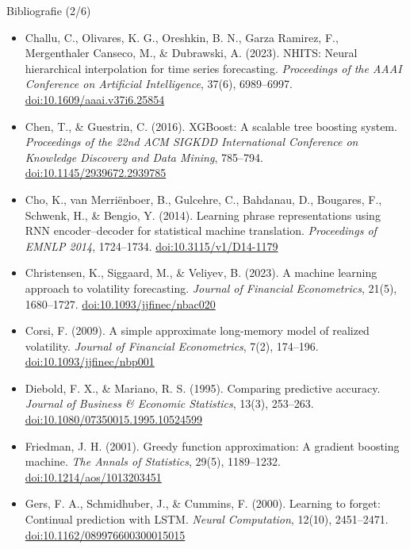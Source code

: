 \begin{frame}{Bibliografie (2/6)}
\itemsize{\tiny}
\begin{itemize}
    \item Challu, C., Olivares, K. G., Oreshkin, B. N., Garza Ramirez, F., Mergenthaler Canseco, M., \& Dubrawski, A. (2023). NHITS: Neural hierarchical interpolation for time series forecasting. \textit{Proceedings of the AAAI Conference on Artificial Intelligence}, 37(6), 6989--6997. \href{https://doi.org/10.1609/aaai.v37i6.25854}{doi:10.1609/aaai.v37i6.25854}
    \item Chen, T., \& Guestrin, C. (2016). XGBoost: A scalable tree boosting system. \textit{Proceedings of the 22nd ACM SIGKDD International Conference on Knowledge Discovery and Data Mining}, 785--794. \href{https://doi.org/10.1145/2939672.2939785}{doi:10.1145/2939672.2939785}
    \item Cho, K., van Merriënboer, B., Gulcehre, C., Bahdanau, D., Bougares, F., Schwenk, H., \& Bengio, Y. (2014). Learning phrase representations using RNN encoder--decoder for statistical machine translation. \textit{Proceedings of EMNLP 2014}, 1724--1734. \href{https://doi.org/10.3115/v1/D14-1179}{doi:10.3115/v1/D14-1179}
    \item Christensen, K., Siggaard, M., \& Veliyev, B. (2023). A machine learning approach to volatility forecasting. \textit{Journal of Financial Econometrics}, 21(5), 1680--1727. \href{https://doi.org/10.1093/jjfinec/nbac020}{doi:10.1093/jjfinec/nbac020}
    \item Corsi, F. (2009). A simple approximate long-memory model of realized volatility. \textit{Journal of Financial Econometrics}, 7(2), 174--196. \href{https://doi.org/10.1093/jjfinec/nbp001}{doi:10.1093/jjfinec/nbp001}
    \item Diebold, F. X., \& Mariano, R. S. (1995). Comparing predictive accuracy. \textit{Journal of Business \& Economic Statistics}, 13(3), 253--263. \href{https://doi.org/10.1080/07350015.1995.10524599}{doi:10.1080/07350015.1995.10524599}
    \item Friedman, J. H. (2001). Greedy function approximation: A gradient boosting machine. \textit{The Annals of Statistics}, 29(5), 1189--1232. \href{https://doi.org/10.1214/aos/1013203451}{doi:10.1214/aos/1013203451}
    \item Gers, F. A., Schmidhuber, J., \& Cummins, F. (2000). Learning to forget: Continual prediction with LSTM. \textit{Neural Computation}, 12(10), 2451--2471. \href{https://doi.org/10.1162/089976600300015015}{doi:10.1162/089976600300015015}

\end{itemize}
\end{frame}
